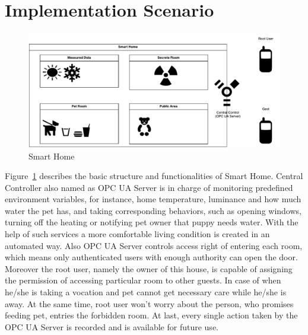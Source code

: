 \documentclass[]{llncs}
\begin{document}
\section{Implementation Scenario}
 \begin{figure}[!htbp]
	\centering
	\includegraphics[width=1.2\textwidth]{SmartHome}
		\caption[ ]{Smart Home}
	\label{fig:SmartHome}
\end{figure}
Figure~\ref{fig:SmartHome} describes the basic structure and functionalities of Smart Home. Central Controller also named as OPC UA Server is in charge of monitoring predefined environment variables, for instance, home temperature, luminance and how much water the pet has, and taking corresponding behaviors, such as opening windows, turning off the heating or notifying pet owner that puppy needs water. With the help of such services a more comfortable living condition is created in an automated way. Also OPC UA Server controls access right of entering each room, which means only authenticated users with enough authority can open the door. Moreover the root user, namely the owner of this house, is capable of assigning the permission of accessing particular room to other guests. In case of when he/she is taking a vocation and pet cannot get necessary care while he/she is away. At the same time, root user won't worry about the person, who promises feeding pet, entries the forbidden room. At last, every single action taken by the OPC UA Server is recorded and is available for future use. 
\end{document}
